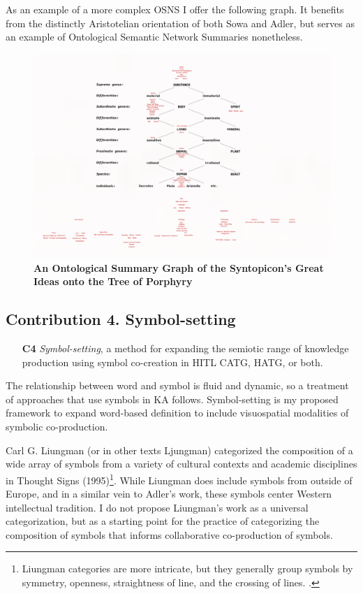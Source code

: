 As an example of a more complex OSNS I offer the following graph. It benefits from the distinctly Aristotelian orientation of both Sowa and Adler, but serves as an example of Ontological Semantic Network Summaries nonetheless.
\FloatBarrier  
\begin{figure}[h]
    \centering
    \includegraphics[width=\textwidth]{figures/6.1.png}
    \caption[An Ontological Summary Graph of the Syntopicon’s Great Ideas onto the Tree of Porphyry]{\textbf{An Ontological Summary Graph of the Syntopicon’s Great Ideas onto the Tree of Porphyry}}
    \label{f6.1}
\end{figure}
\FloatBarrier  


\subsection{Contribution 4. Symbol-setting}
\begin{enumerate}
        \item[\textbf{C4}] \textit{Symbol-setting}, a method for expanding the semiotic range of knowledge production using symbol co-creation in HITL CATG, HATG, or both.
\end{enumerate}
The relationship between word and symbol is fluid and dynamic, so a treatment of approaches that use symbols in KA follows. Symbol-setting is my proposed framework to expand word-based definition to include visuospatial modalities of symbolic co-production. 

Carl G. Liungman (or in other texts Ljungman) categorized the composition of a wide array of symbols from a variety of cultural contexts and academic disciplines in Thought Signs (1995)\footnote{Liungman categories are more intricate, but they generally group symbols by symmetry, openness, straightness of line, and the crossing of lines. \citep[p. 49-93]{liungman_thought_1995}.}. While Liungman does include symbols from outside of Europe, and in a similar vein to Adler’s work, these symbols center Western intellectual tradition. I do not propose Liungman’s work as a universal categorization, but as a starting point for the practice of categorizing the composition of symbols that informs collaborative co-production of symbols. 

